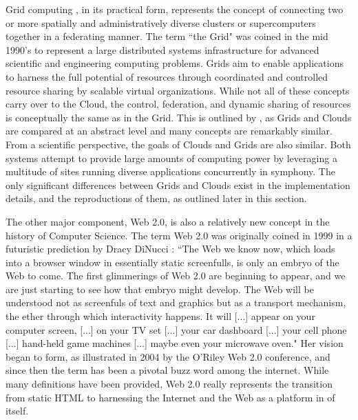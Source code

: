 Grid computing \cite{foster2001a, foster2002b}, in its practical form, represents the concept of connecting two or more spatially and administratively diverse clusters or supercomputers together in a federating manner.  The term ``the Grid" was coined in the mid 1990's to represent a large distributed systems infrastructure for advanced scientific and engineering computing problems. Grids aim to enable applications to harness the full potential of resources through coordinated and controlled resource sharing by scalable virtual organizations.  While not all of these concepts carry over to the Cloud, the control, federation, and dynamic sharing of resources is conceptually the same as in the Grid.  This is outlined by \cite{foster2008cca}, as Grids and Clouds are compared at an abstract level and many concepts are remarkably similar.  From a scientific perspective, the goals of Clouds and Grids are also similar.  Both systems attempt to provide large amounts of computing power by leveraging a multitude of sites running diverse applications concurrently in symphony.  The only significant differences between Grids and Clouds exist in the implementation details, and the reproductions of them, as outlined later in this section.

The other major component, Web 2.0, is also a relatively new concept in the history of Computer Science.  The term Web 2.0 was originally coined in 1999 in a futuristic prediction by Dracy DiNucci \cite{dinucci1999fragmented}: ``The Web we know now, which loads into a browser window in essentially static screenfulls, is only an embryo of the Web to come. The first glimmerings of Web 2.0 are beginning to appear, and we are just starting to see how that embryo might develop. The Web will be understood not as screenfuls of text and graphics but as a transport mechanism, the ether through which interactivity happens. It will [...] appear on your computer screen, [...] on your TV set [...] your car dashboard [...] your cell phone [...] hand-held game machines [...] maybe even your microwave oven."  Her vision began to form, as illustrated in 2004 by the O'Riley Web 2.0 conference, and since then the term has been a pivotal buzz word among the internet.  While many definitions have been provided, Web 2.0 really represents the transition from static HTML to harnessing the Internet and the Web as a platform in of itself.  

